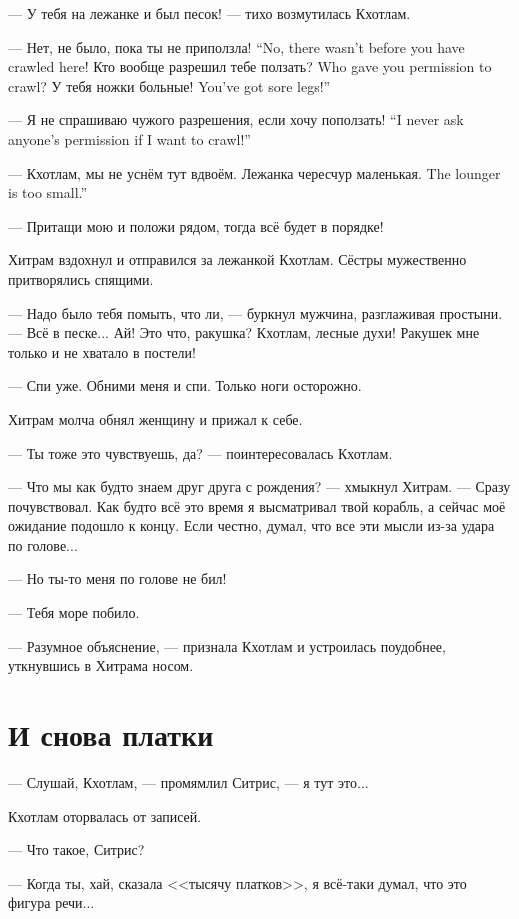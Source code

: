--- У тебя на лежанке и был песок! --- тихо возмутилась Кхотлам.

{--- Нет, не было, пока ты не приползла!}
{``No, there wasn't before you have crawled here!}
{Кто вообще разрешил тебе ползать?}
{Who gave you permission to crawl?}
{У тебя ножки больные!}
{You've got sore legs!''}

{--- Я не спрашиваю чужого разрешения, если хочу поползать!}
{``I never ask anyone's permission if I want to crawl!''}

--- Кхотлам, мы не уснём тут вдвоём.
{Лежанка чересчур маленькая.}
{The lounger is too small.''}

--- Притащи мою и положи рядом, тогда всё будет в порядке!

Хитрам вздохнул и отправился за лежанкой Кхотлам.
Сёстры мужественно притворялись спящими.

--- Надо было тебя помыть, что ли, --- буркнул мужчина, разглаживая простыни.
--- Всё в песке...
Ай!
Это что, ракушка?
Кхотлам, лесные духи!
Ракушек мне только и не хватало в постели!

--- Спи уже.
Обними меня и спи.
Только ноги осторожно.

Хитрам молча обнял женщину и прижал к себе.

--- Ты тоже это чувствуешь, да? --- поинтересовалась Кхотлам.

--- Что мы как будто знаем друг друга с рождения? --- хмыкнул Хитрам.
--- Сразу почувствовал.
Как будто всё это время я высматривал твой корабль, а сейчас моё ожидание подошло к концу.
Если честно, думал, что все эти мысли из-за удара по голове...

--- Но ты-то меня по голове не бил!

--- Тебя море побило.

--- Разумное объяснение, --- признала Кхотлам и устроилась поудобнее, уткнувшись в Хитрама носом.

\section{И снова платки}

--- Слушай, Кхотлам, --- промямлил Ситрис, --- я тут это...

Кхотлам оторвалась от записей.

--- Что такое, Ситрис?

--- Когда ты, хай, сказала <<тысячу платков>>, я всё-таки думал, что это фигура речи...

